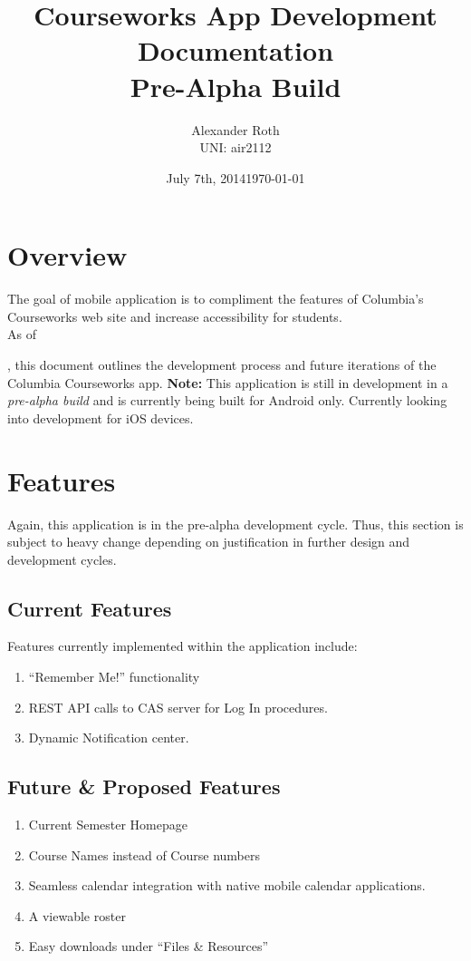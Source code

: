 \documentclass{article}
\title{Courseworks App Development Documentation \\ Pre-Alpha Build}
\author{Alexander Roth \\ UNI: air2112}
\date{July 7th, 2014}
\begin{document}
\maketitle

\section{Overview}
The goal of mobile application is to compliment the features of Columbia's Courseworks web
site and increase accessibility for students. \\
\indent As of \date{\today}, this document outlines the development process and future 
iterations of the Columbia Courseworks app. 
\textbf{Note:} This application is still in development in a \emph{pre-alpha build} and is
currently being built for Android only. Currently looking into development for iOS
devices.

\section{Features}
Again, this application is in the pre-alpha development cycle. Thus, this section is 
subject to heavy change depending on justification in further design and development 
cycles.

\subsection{Current Features}
Features currently implemented within the application include:
\begin{enumerate}
    \item   ``Remember Me!'' functionality
    \item   REST API calls to CAS server for Log In procedures.
    \item   Dynamic Notification center.
\end{enumerate}

\subsection{Future \& Proposed Features}
\begin{enumerate}
    \item   Current Semester Homepage
    \item   Course Names instead of Course numbers
    \item   Seamless calendar integration with native mobile calendar applications.
    \item   A viewable roster
    \item   Easy downloads under ``Files \& Resources''
\end{enumerate}
\end{document}
